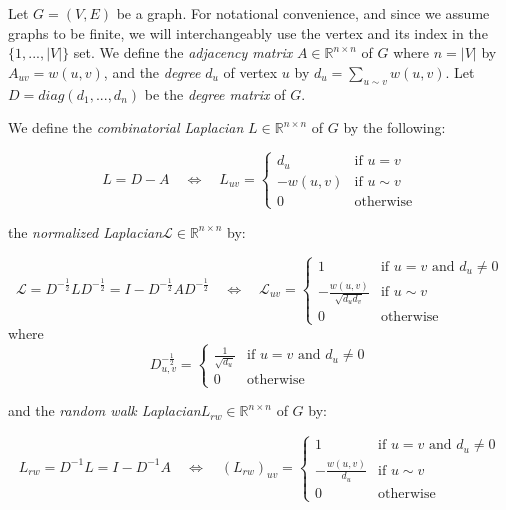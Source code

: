 Let $G = (V,E)$ be a graph. For notational convenience, and since we assume graphs to be finite, we will interchangeably use the vertex and its index in the $\{1, ..., |V|\}$ set. We define the \emph{adjacency matrix} $A \in \mathbb{R}^{n \times n}$ of $G$ where $n = |V|$ by $A_{uv} = w(u,v)$, and the \emph{degree} $d_u$ of vertex $u$ by $d_u = \sum_{u \sim v} w(u,v)$. Let $D = diag(d_1, ..., d_n)$ be the \emph{degree matrix} of $G$.

We define the \emph{combinatorial Laplacian} $L \in \mathbb{R}^{n \times n}$ of $G$ by the following:

\[
L = D - A \quad \Leftrightarrow \quad L_{uv} = \begin{cases}
d_u & \text{if }u = v \\
-w(u,v) & \text{if }u \sim v \\
0 & \text{otherwise}
\end{cases}
\]

the \emph{normalized Laplacian}\footnotemark[1] $\mathcal{L} \in \mathbb{R}^{n \times n}$ by:


\[
\mathcal{L} = D^{-\frac{1}{2}}LD^{-\frac{1}{2}} = I - D^{-\frac{1}{2}}AD^{-\frac{1}{2}} \quad \Leftrightarrow \quad \mathcal{L}_{uv} = \begin{cases}
1 & \text{if } u = v \text{ and } d_u \neq 0\\
-\frac{w(u,v)}{\sqrt{d_ud_v}} & \text{if } u \sim v\\
0 & \text{otherwise}
\end{cases}
\]
where
\[
D^{-\frac{1}{2}}_{u,v} = \begin{cases}
\frac{1}{\sqrt{d_u}} & \text{if }u = v\text{ and }d_u \neq 0\\
0 & \text{otherwise}
\end{cases}
\]

and the \emph{random walk Laplacian}\footnotemark[2] $L_{rw} \in \mathbb{R}^{n \times n}$ of $G$ by:


\[
L_{rw} = D^{-1}L = I - D^{-1}A \quad \Leftrightarrow \quad (L_{rw})_{uv} = \begin{cases}
1 & \text{if }u = v \text{ and }d_u \neq 0 \\
-\frac{w(u,v)}{d_u} & \text{if }u \sim v \\
0 & \text{otherwise}
\end{cases}
\]

